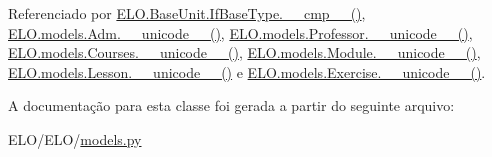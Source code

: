 Referenciado por \hyperlink{classELO_1_1BaseUnit_1_1IfBaseType_a22d6f30c4d9504a9c20d0ff5a538544d}{E\+L\+O.\+Base\+Unit.\+If\+Base\+Type.\+\_\+\+\_\+cmp\+\_\+\+\_\+()}, \hyperlink{classELO_1_1models_1_1Adm_a321eaeaced2b6423fd23ad9d0401808e}{E\+L\+O.\+models.\+Adm.\+\_\+\+\_\+unicode\+\_\+\+\_\+()}, \hyperlink{classELO_1_1models_1_1Professor_a8c0714e4a283c139c0d7aed94a498a7b}{E\+L\+O.\+models.\+Professor.\+\_\+\+\_\+unicode\+\_\+\+\_\+()}, \hyperlink{classELO_1_1models_1_1Courses_a8676cba71b99ab2ba60726b9b5e33825}{E\+L\+O.\+models.\+Courses.\+\_\+\+\_\+unicode\+\_\+\+\_\+()}, \hyperlink{classELO_1_1models_1_1Module_a8fc9fadf09fa7b3bbcfea69ebe25d278}{E\+L\+O.\+models.\+Module.\+\_\+\+\_\+unicode\+\_\+\+\_\+()}, \hyperlink{classELO_1_1models_1_1Lesson_a53e265de97c6b73f262f62a80f9ca994}{E\+L\+O.\+models.\+Lesson.\+\_\+\+\_\+unicode\+\_\+\+\_\+()} e \hyperlink{classELO_1_1models_1_1Exercise_a23f81c66e4d6bc5a4582d74d191f5117}{E\+L\+O.\+models.\+Exercise.\+\_\+\+\_\+unicode\+\_\+\+\_\+()}.



A documentação para esta classe foi gerada a partir do seguinte arquivo\+:\begin{DoxyCompactItemize}
\item 
E\+L\+O/\+E\+L\+O/\hyperlink{ELO_2models_8py}{models.\+py}\end{DoxyCompactItemize}
